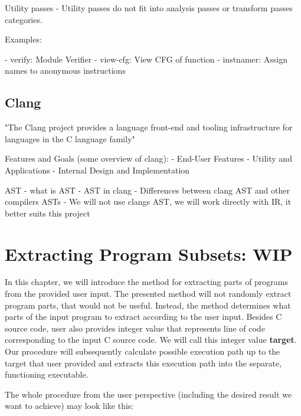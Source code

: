 \documentclass[12pt, twoside]{fithesis2}
\renewcommand{\_}{\leavevmode \kern0.07em\vbox{\hrule width0.4em}}
\begin{document}
Utility passes
- Utility passes do not fit into analysis passes or transform passes categories.

Examples:

- verify: Module Verifier
- view-cfg: View CFG of function
- instnamer: Assign names to anonymous instructions

\section{Clang}
\label{sec:llvm-clang}

"The Clang project provides a language front-end and tooling infrastructure for
languages in the C language family"

Features and Goals (some overview of clang):
- End-User Features
- Utility and Applications
- Internal Design and Implementation

AST
- what is AST
- AST in clang
- Differences between clang AST and other compilers ASTs
- We will not use clangs AST, we will work directly with IR, it better suits
this project


\chapter{Extracting Program Subsets: WIP}
\label{chap:design}


In this chapter, we will introduce the method for extracting parts of programs
from the provided user input. The presented method will not randomly extract
program parts, that would not be useful. Instead, the method determines what
parts of the input program to extract according to the user input. Besides C
source code, user also provides integer value that represents line of code
corresponding to the input C source code. We will call this integer value
\textbf{target}.  Our procedure will subsequently calculate possible execution
path up to the target that user provided and extracts this execution path into
the separate, functioning executable.

The whole procedure from the user perspective (including the desired result we
want to achieve) may look like this:
\end{document}
